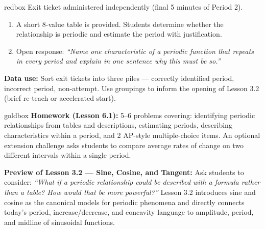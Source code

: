 \documentclass[10pt]{article}
\begin{document}
\vspace{0.08in}

\begin{skillbox}{redbox}
Exit ticket administered independently (final 5 minutes of Period 2).

\begin{enumerate}[leftmargin=1.4em, itemsep=4pt]
  \item A short 8-value table is provided. Students determine whether the
    relationship is periodic and estimate the period with justification.
  \item Open response: \textit{``Name one characteristic of a periodic function
    that repeats in every period and explain in one sentence why this must
    be so.''}
\end{enumerate}

\textbf{Data use:} Sort exit tickets into three piles --- correctly identified
period, incorrect period, non-attempt. Use groupings to inform the opening
of Lesson 3.2 (brief re-teach or accelerated start).
\end{skillbox}

\vspace{0.08in}

\begin{skillbox}{goldbox}
\textbf{Homework (Lesson 6.1):} 5--6 problems covering: identifying periodic
relationships from tables and descriptions, estimating periods, describing
characteristics within a period, and 2 AP-style multiple-choice items.
An optional extension challenge asks students to compare average rates of
change on two different intervals within a single period.

\textbf{Preview of Lesson 3.2 --- Sine, Cosine, and Tangent:}
Ask students to consider: \textit{``What if a periodic relationship could be
described with a \emph{formula} rather than a table? How would that be more
powerful?''} Lesson 3.2 introduces sine and cosine as the canonical models
for periodic phenomena and directly connects today's period, increase/decrease,
and concavity language to amplitude, period, and midline of sinusoidal functions.
\end{skillbox}
\end{document}

